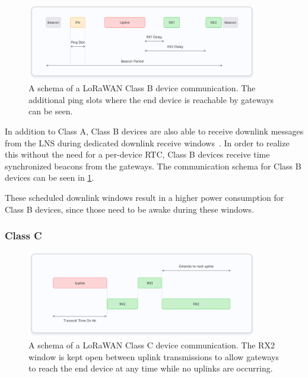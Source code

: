 \begin{figure}[htbp]
    \centering
    \includegraphics[width=0.9\textwidth]{pictures/device-classes/class-b.png}
    \caption{
        A schema of a \ac{LoRaWAN} Class B device communication.
        The additional ping slots where the end device is reachable by gateways can be seen.~\protect\cite{the_things_industries_bv_device_nodate}
    }\label{pic:lorawan-device-class-b-schema}
\end{figure}

In addition to Class A, Class B devices are also able to receive downlink messages from the \ac{LNS} during dedicated downlink receive windows~\cite[p. 67]{lora_alliance_inc_lorawan_specification_2017}.
In order to realize this without the need for a per-device \ac{RTC}, Class B devices receive time synchronized beacons from the gateways.
The communication schema for Class B devices can be seen in \cref{pic:lorawan-device-class-b-schema}.

These scheduled downlink windows result in a higher power consumption for Class B devices, since those need to be awake during these windows.

\subsubsection{Class C}

\begin{figure}[htbp]
    \centering
    \includegraphics[width=0.9\textwidth]{pictures/device-classes/class-c.png}
    \caption{
        A schema of a \ac{LoRaWAN} Class C device communication.
        The RX2 window is kept open between uplink transmissions to allow gateways to reach the end device at any time while no uplinks are occurring.~\protect\cite{the_things_industries_bv_device_nodate}
    }\label{pic:lorawan-device-class-c-schema}
\end{figure}


